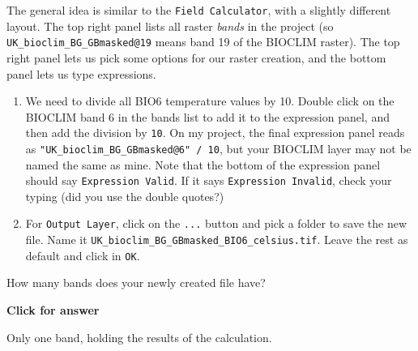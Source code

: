 \documentclass[
  letterpaper,
  DIV=11,
  numbers=noendperiod]{scrreprt}
\begin{document}
The general idea is similar to the \texttt{Field\ Calculator}, with a
slightly different layout. The top right panel lists all raster
\emph{bands} in the project (so \texttt{UK\_bioclim\_BG\_GBmasked@19}
means band 19 of the BIOCLIM raster). The top right panel lets us pick
some options for our raster creation, and the bottom panel lets us type
expressions.

\begin{enumerate}
\def\labelenumi{(\arabic{enumi})}
\setcounter{enumi}{165}
\item
  We need to divide all BIO6 temperature values by 10. Double click on
  the BIOCLIM band 6 in the bands list to add it to the expression
  panel, and then add the division by \texttt{10}. On my project, the
  final expression panel reads as
  \texttt{"UK\_bioclim\_BG\_GBmasked@6"\ /\ 10}, but your BIOCLIM layer
  may not be named the same as mine. Note that the bottom of the
  expression panel should say \texttt{Expression\ Valid}. If it says
  \texttt{Expression\ Invalid}, check your typing (did you use the
  double quotes?)
\item
  For \texttt{Output\ Layer}, click on the \texttt{...} button and pick
  a folder to save the new file. Name it
  \texttt{UK\_bioclim\_BG\_GBmasked\_BIO6\_celsius.tif}. Leave the rest
  as default and click in \texttt{OK}.
\end{enumerate}

\begin{tcolorbox}[enhanced jigsaw, coltitle=black, toprule=.15mm, breakable, opacitybacktitle=0.6, left=2mm, colback=white, leftrule=.75mm, rightrule=.15mm, colbacktitle=quarto-callout-important-color!10!white, toptitle=1mm, titlerule=0mm, colframe=quarto-callout-important-color-frame, arc=.35mm, bottomtitle=1mm, opacityback=0, bottomrule=.15mm, title=\textcolor{quarto-callout-important-color}{\faExclamation}\hspace{0.5em}{Stop and Think}]

How many bands does your newly created file have?

\end{tcolorbox}

\begin{tcolorbox}[enhanced jigsaw, toprule=.15mm, breakable, left=2mm, colframe=quarto-callout-important-color-frame, colback=white, arc=.35mm, leftrule=.75mm, opacityback=0, rightrule=.15mm, bottomrule=.15mm]

\vspace{-3mm}\textbf{Click for answer}\vspace{3mm}

Only one band, holding the results of the calculation.

\end{tcolorbox}
\end{document}
